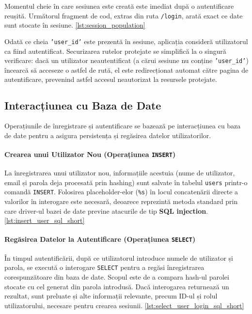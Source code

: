 \documentclass[12pt, a4paper, oneside, romanian]{teza-upb}
\begin{document}
Momentul cheie în care sesiunea este creată este imediat după o autentificare reușită. Următorul fragment de cod, extras din ruta \texttt{/login}, arată exact ce date sunt stocate în sesiune. \ref{lst:session_population}



Odată ce cheia \texttt{'user\_id'} este prezentă în sesiune, aplicația consideră utilizatorul ca fiind autentificat. Securizarea rutelor protejate se simplifică la o singură verificare: dacă un utilizator neautentificat (a cărui sesiune nu conține \texttt{'user\_id'}) încearcă să acceseze o astfel de rută, el este redirecționat automat către pagina de autentificare, prevenind astfel accesul neautorizat la resursele protejate.

\subsection{Interacțiunea cu Baza de Date}
Operațiunile de înregistrare și autentificare se bazează pe interacțiunea cu baza de date pentru a asigura persistența și regăsirea datelor utilizatorilor.

\paragraph{Crearea unui Utilizator Nou (Operațiunea \texttt{INSERT})}
La înregistrarea unui utilizator nou, informațiile acestuia (nume de utilizator, email și parola deja procesată prin hashing) sunt salvate în tabelul \texttt{users} printr-o comandă \texttt{INSERT}. Folosirea placeholder-elor (\texttt{\%s}) în locul concatenării directe a valorilor în interogare este necesară, deoarece reprezintă metoda standard prin care driver-ul bazei de date previne atacurile de tip \textbf{SQL injection}. \ref{lst:insert_user_sql_short}


\paragraph{Regăsirea Datelor la Autentificare (Operațiunea \texttt{SELECT})}
În timpul autentificării, după ce utilizatorul introduce numele de utilizator și parola, se execută o interogare \texttt{SELECT} pentru a regăsi înregistrarea corespunzătoare din baza de date. Scopul este de a compara hash-ul parolei stocate cu cel generat din parola introdusă. Dacă interogarea returnează un rezultat, sunt preluate și alte informații relevante, precum ID-ul și rolul utilizatorului, necesare pentru crearea sesiunii. \ref{lst:select_user_login_sql_short}
\end{document}
